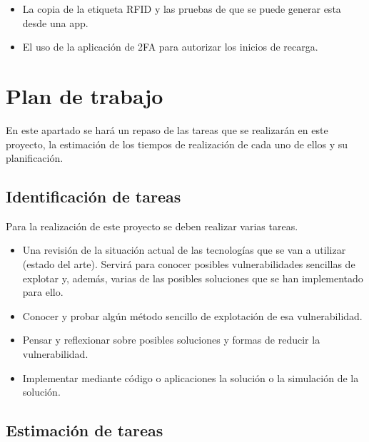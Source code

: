 \documentclass[12pt,a4paper,onecolumn,oneside]{report}
\begin{document}
\begin{itemize}
\item La copia de la etiqueta RFID y las pruebas de que se puede generar esta desde una app.
\item El uso de la aplicación de 2FA para autorizar los inicios de recarga.
\end{itemize}

\section{Plan de trabajo}
\label{Plan de trabajo}

En este apartado se hará un repaso de las tareas que se realizarán en este proyecto, la estimación de los tiempos de realización de cada uno de ellos y su planificación.

\subsection{Identificación de tareas}

Para la realización de este proyecto se deben realizar varias tareas. 
\begin{itemize}
\item Una revisión de la situación actual de las tecnologías que se van a utilizar (estado del arte). Servirá para conocer posibles vulnerabilidades sencillas de explotar y, además, varias de las posibles soluciones que se han implementado para ello.
\item Conocer y probar algún método sencillo de explotación de esa vulnerabilidad.
\item Pensar y reflexionar sobre posibles soluciones y formas de reducir la vulnerabilidad.
\item Implementar mediante código o aplicaciones la solución o la simulación de la solución.
\end{itemize}

\subsection{Estimación de tareas}
\end{document}
